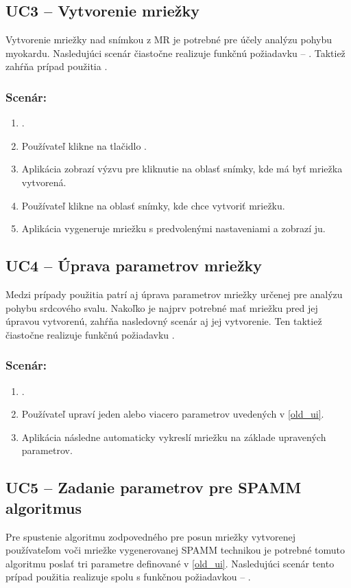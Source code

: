 \subsection {UC3 -- Vytvorenie mriežky}\label{uc3}
Vytvorenie mriežky nad snímkou z MR je potrebné pre účely analýzu pohybu myokardu. Nasledujúci scenár čiastočne realizuje funkčnú požiadavku -- . Taktiež zahŕňa prípad použitia .

\subsubsection*{Scenár:}
\begin {enumerate}
\item {.}
\item {Používateľ klikne na tlačidlo .}
\item {Aplikácia zobrazí výzvu pre kliknutie na oblasť snímky, kde má byť mriežka vytvorená.}
\item {Používateľ klikne na oblasť snímky, kde chce vytvoriť mriežku.}
\item {Aplikácia vygeneruje mriežku s predvolenými nastaveniami a zobrazí ju.}
\end {enumerate}

\subsection {UC4 -- Úprava parametrov mriežky}\label{uc4}
Medzi prípady použitia patrí aj úprava parametrov mriežky určenej pre analýzu pohybu srdcového svalu. Nakoľko je najprv potrebné mať mriežku  pred jej úpravou vytvorenú, zahŕňa nasledovný scenár aj jej vytvorenie. Ten taktiež čiastočne realizuje funkčnú požiadavku .

\subsubsection*{Scenár:}
\begin {enumerate}
\item {.}
\item {Používateľ upraví jeden alebo viacero parametrov uvedených v \ref{old_ui}.}
\item {Aplikácia následne automaticky vykreslí mriežku na základe upravených parametrov.}
\end {enumerate}

\clearpage

\subsection {UC5 -- Zadanie parametrov pre SPAMM algoritmus}\label{uc5}
Pre spustenie algoritmu zodpovedného pre posun mriežky vytvorenej používateľom voči mriežke vygenerovanej SPAMM technikou je potrebné tomuto algoritmu poslať tri parametre definované v \ref{old_ui}. Nasledujúci scenár tento prípad použitia realizuje spolu s funkčnou požiadavkou -- .

